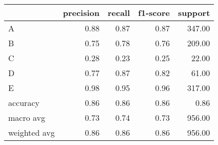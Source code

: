 \begin{tabular}{|l|r|r|r|r|}
\hline
{} &  precision &  recall &  f1-score &  support \\
\hline
A            &       0.88 &    0.87 &      0.87 &   347.00 \\
B            &       0.75 &    0.78 &      0.76 &   209.00 \\
C            &       0.28 &    0.23 &      0.25 &    22.00 \\
D            &       0.77 &    0.87 &      0.82 &    61.00 \\
E            &       0.98 &    0.95 &      0.96 &   317.00 \\
accuracy     &       0.86 &    0.86 &      0.86 &     0.86 \\
macro avg    &       0.73 &    0.74 &      0.73 &   956.00 \\
weighted avg &       0.86 &    0.86 &      0.86 &   956.00 \\
\hline
\end{tabular}
